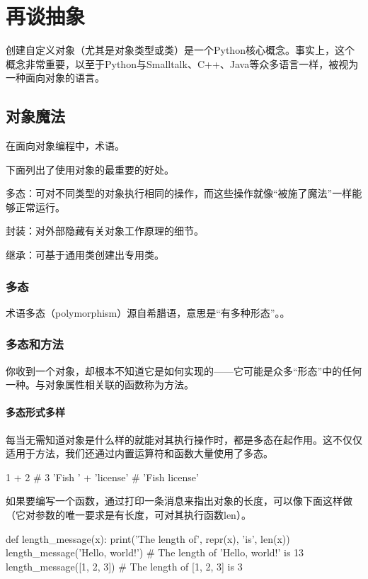 \chapter{再谈抽象\label{chapter07}}
创建自定义对象（尤其是对象类型或类）是一个Python核心概念。事实上，这个概念非常重要，以至于Python与Smalltalk、C++、Java等众多语言一样，被视为一种面向对象的语言。

\section{对象魔法}
在面向对象编程中，术语。

下面列出了使用对象的最重要的好处。
\begin{dinglist}{43}
    \item 多态：可对不同类型的对象执行相同的操作，而这些操作就像“被施了魔法”一样能够正常运行。
    \item 封装：对外部隐藏有关对象工作原理的细节。
    \item 继承：可基于通用类创建出专用类。
\end{dinglist}

\subsection{多态}
术语多态（polymorphism）源自希腊语，意思是``有多种形态”。。
\subsection{多态和方法}
你收到一个对象，却根本不知道它是如何实现的——它可能是众多``形态”中的任何一种。与对象属性相关联的函数称为方法。

\subsubsection{多态形式多样}
每当无需知道对象是什么样的就能对其执行操作时，都是多态在起作用。这不仅仅适用于方法，我们还通过内置运算符和函数大量使用了多态。
\begin{pyc}
1 + 2  # 3
'Fish ' + 'license'  # 'Fish license'
\end{pyc}

如果要编写一个函数，通过打印一条消息来指出对象的长度，可以像下面这样做（它对参数的唯一要求是有长度，可对其执行函数len）。

\begin{pyc}
def length_message(x):
    print('The length of', repr(x), 'is', len(x))
length_message('Hello, world!')  # The length of 'Hello, world!' is 13
length_message([1, 2, 3])  # The length of [1, 2, 3] is 3
\end{pyc}

